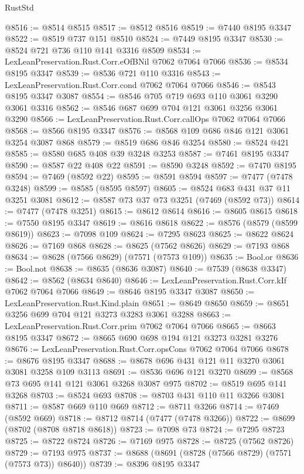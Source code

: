 \begin{lexlean}{RustStd}
\begin{coremodule}
@8516 := @8514 @8515
@8517 := @8512 @8516
@8519 := @7440 @8195 @3347
@8522 := @8519 @737 @151 @8510
@8524 := @7449 @8195 @3347
@8530 := @8524 @721 @736 @110 @141 @3316 @8509
@8534 := LexLeanPreservation.Rust.Corr.eOfBNil @7062 @7064 @7066
@8536 := @8534 @8195 @3347
@8539 := @8536 @721 @110 @3316
@8543 := LexLeanPreservation.Rust.Corr.cond @7062 @7064 @7066
@8546 := @8543 @8195 @3347 @3087
@8554 := @8546 @705 @719 @693 @110 @3061 @3290 @3061 @3316
@8562 := @8546 @687 @699 @704 @121 @3061 @3256 @3061 @3290
@8566 := LexLeanPreservation.Rust.Corr.callOps @7062 @7064 @7066
@8568 := @8566 @8195 @3347
@8576 := @8568 @109 @686 @846 @121 @3061 @3254 @3087 @868
@8579 := @8519 @686 @846 @3254
@8580 := @8524 @421
@8585 := @8580 @685 @408 @39 @3248 @3253
@8587 := @7461 @8195 @3347
@8590 := @8587 @22 @408 @22
@8591 := @8590 @3248
@8592 := @7470 @8195
@8594 := @7469 (@8592 @22)
@8595 := @8591 @8594
@8597 := @7477 (@7478 @3248)
@8599 := @8585 (@8595 @8597)
@8605 := @8524 @683 @431 @37 @11 @3251 @3081
@8612 := @8587 @73 @37 @73 @3251 (@7469 (@8592 @73))
@8614 := @7477 (@7478 @3251)
@8615 := @8612 @8614
@8616 := @8605 @8615
@8618 := @7550 @8195 @3347
@8619 := @8616 @8618
@8622 := @8576 (@8579 (@8599 @8619))
@8623 := @7098 @109
@8624 := @7295 @8623
@8625 := @8622 @8624
@8626 := @7169 @868
@8628 := @8625 (@7562 @8626)
@8629 := @7193 @868
@8634 := @8628 (@7566 @8629) (@7571 (@7573 @109))
@8635 := Bool.or
@8636 := Bool.not
@8638 := @8635 (@8636 @3087)
@8640 := @7539 (@8638 @3347)
@8642 := @8562 (@8634 @8640)
@8646 := LexLeanPreservation.Rust.Corr.kIf @7062 @7064 @7066
@8649 := @8646 @8195 @3347 @3087
@8650 := LexLeanPreservation.Rust.Kind.plain
@8651 := @8649 @8650
@8659 := @8651 @3256 @699 @704 @121 @3273 @3283 @3061 @3288
@8663 := LexLeanPreservation.Rust.Corr.prim @7062 @7064 @7066
@8665 := @8663 @8195 @3347
@8672 := @8665 @690 @698 @194 @121 @3273 @3281 @3276
@8676 := LexLeanPreservation.Rust.Corr.opsCons @7062 @7064 @7066
@8678 := @8676 @8195 @3347
@8688 := @8678 @696 @431 @121 @11 @3270 @3061 @3081 @3258 @109 @3113
@8691 := @8536 @696 @121 @3270
@8699 := @8568 @73 @695 @141 @121 @3061 @3268 @3087 @975
@8702 := @8519 @695 @141 @3268
@8703 := @8524 @693
@8708 := @8703 @431 @110 @11 @3266 @3081
@8711 := @8587 @669 @110 @669
@8712 := @8711 @3266
@8714 := @7469 (@8592 @669)
@8718 := @8712 @8714 (@7477 (@7478 @3266))
@8722 := @8699 (@8702 (@8708 @8718 @8618))
@8723 := @7098 @73
@8724 := @7295 @8723
@8725 := @8722 @8724
@8726 := @7169 @975
@8728 := @8725 (@7562 @8726)
@8729 := @7193 @975
@8737 := @8688 (@8691 (@8728 (@7566 @8729) (@7571 (@7573 @73)) @8640))
@8739 := @8396 @8195 @3347

\end{coremodule}
\end{lexlean}
